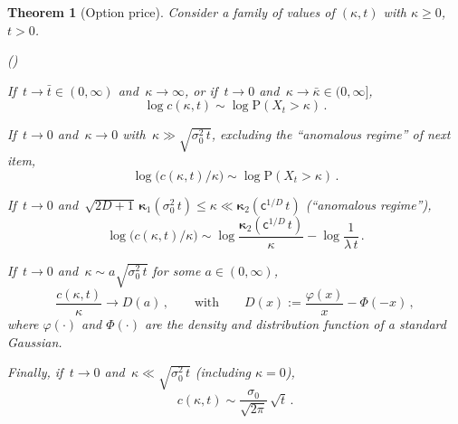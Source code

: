 \documentclass[a4paper,reqno,11pt]{amsart}
\numberwithin{equation}{section}
\newtheorem{theorem}{Theorem}[section]
\newcommand{\PEfont}{\mathrm}
\renewcommand{\P}{\ensuremath{\PEfont P}}
\renewcommand{\phi}{\varphi}
\newcommand\sfc{\mathsf{c}}
\newenvironment{aenumerate}{%
\renewcommand{\theenumi}{\alph{enumi}}%
\renewcommand{\labelenumi}{{\rm(\theenumi)}}%
\begin{list}{\labelenumi}
	{%
	\setlength{\itemsep}{0.4em}%
	\setlength{\topsep}{0.5em}%
	\setlength\leftmargin{2.45em}%
	\setlength\labelwidth{2.05em}%
	\setlength{\labelsep}{0.4em}%
	\usecounter{enumi}%
	}%
	}%
{\end{list}
}
\newcommand\bkappa{\boldsymbol{\kappa}}
\newcommand\blue{\color{blue}}
\begin{document}
\begin{theorem}[Option price]
\label{ch3:lemma:calltgamma}
Consider a family of values of $(\kappa,t)$ with $\kappa \ge 0$, $t > 0$.

\begin{aenumerate}
\item\label{op:a} If $\,t \to \bar t \in (0,\infty)$ and $\,\kappa \to \infty$,
or if $\,t \to 0$ and $\,\kappa \to \bar\kappa \in (0,\infty]$,
\begin{equation}\label{ch3:eq:casinfty}
	\log c(\kappa,t) \sim \log \P(X_t > \kappa)  \,.
\end{equation}

\item\label{op:b} If $\,t \to 0$ and $\,\kappa \to 0$ with 
$\,\kappa \gg \sqrt{ \sigma_0^2 \, t}$,
excluding the ``anomalous regime'' of next item,
\begin{equation}\label{ch3:eq:cas0good}
	\log \big( c(\kappa,t)/\kappa \big) \sim \log \P(X_t > \kappa)  \,.
\end{equation}

\item\label{op:c} If $\,t \to 0$ and $\,\sqrt{2D+1} \, \bkappa_1( \sigma_0^2 \, t) 
\leq \kappa \ll \bkappa_2( \sfc^{1/D} \, t)$
(``anomalous regime''),
\begin{equation}\label{ch3:eq:cas0bad2}
	\log \big( c(\kappa,t)/\kappa \big)
	\sim \log \frac{\bkappa_2(\sfc^{1/D} \, t)}{\kappa}
	- \log \frac{1}{\lambda \, t} \,.
\end{equation}

\item\label{op:d} If $\,t \to 0$ and $\,\kappa \sim a \sqrt{ \sigma_0^2 \, t}$
for some $a \in (0,\infty)$,
\begin{equation}\label{ch3:eq:typ}
	\frac{c(\kappa, t)}{\kappa} \to
	D( a ) \,, \qquad
	\text{with} \qquad
	D(x) := \frac{\phi(x)}{x} - \Phi(-x) \,,
\end{equation}
where $\phi(\cdot)$ and $\Phi(\cdot)$ are the density and distribution
function of a standard Gaussian.

\item\label{op:e} Finally, if $\,t \to 0$ and $\,\kappa \ll \sqrt{\sigma_0^2 \, t}$
(including $\kappa = 0$),
\begin{equation}\label{ch3:eq:typlast}
	c(\kappa, t) \sim \frac{ \sigma_0}{\sqrt{2\pi}} \, \sqrt{ t} \, .
\end{equation}
\end{aenumerate}
\end{theorem}
\end{document}
